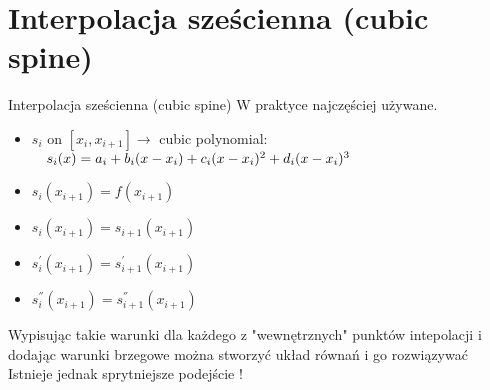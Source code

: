 \section{Interpolacja sześcienna (cubic spine)}
	\begin{frame}{Interpolacja sześcienna (cubic spine)}
	 W praktyce najczęściej używane.
		\begin{block}{}
			\begin{itemize}
				\item $s_{i}$ on $[x_{i},x_{i+1}] \rightarrow$ cubic polynomial:
                $\newline \ \ \ s_{i}(x)=a_{i}+b_{i}(x-x_{i})+c_{i}(x-x_{i})^{2}+
                d_{i}(x-x_{i})^{3}$
                \item $s_{i}(x_{i+1})=f(x_{i+1})$
                \item $s_{i}(x_{i+1})=s_{i+1}(x_{i+1})$
                \item $s^{'}_{i}(x_{i+1})=s^{'}_{i+1}(x_{i+1})$
                \item $s^{''}_{i}(x_{i+1})=s^{''}_{i+1}(x_{i+1})$
			\end{itemize}
		\end{block}
		
		
		Wypisując takie warunki dla każdego z "wewnętrznych"  punktów intepolacji i dodając warunki brzegowe można stworzyć układ równań i go rozwiązywać\\
		Istnieje jednak sprytniejsze podejście !
        
	\end{frame}